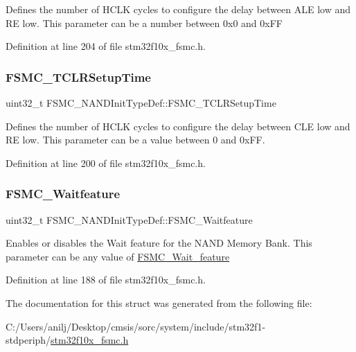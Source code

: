 Defines the number of H\+C\+LK cycles to configure the delay between A\+LE low and RE low. This parameter can be a number between 0x0 and 0x\+FF 

Definition at line 204 of file stm32f10x\+\_\+fsmc.\+h.

\mbox{\label{struct_f_s_m_c___n_a_n_d_init_type_def_a633c7be46a1d281916b9f2e34fa3d36a}} 
\subsubsection{\texorpdfstring{F\+S\+M\+C\+\_\+\+T\+C\+L\+R\+Setup\+Time}{FSMC\_TCLRSetupTime}}
{\footnotesize\ttfamily uint32\+\_\+t F\+S\+M\+C\+\_\+\+N\+A\+N\+D\+Init\+Type\+Def\+::\+F\+S\+M\+C\+\_\+\+T\+C\+L\+R\+Setup\+Time}

Defines the number of H\+C\+LK cycles to configure the delay between C\+LE low and RE low. This parameter can be a value between 0 and 0x\+FF. 

Definition at line 200 of file stm32f10x\+\_\+fsmc.\+h.

\mbox{\label{struct_f_s_m_c___n_a_n_d_init_type_def_ab350e15014c4a9f4b2c2f2848f11eeca}} 
\subsubsection{\texorpdfstring{F\+S\+M\+C\+\_\+\+Waitfeature}{FSMC\_Waitfeature}}
{\footnotesize\ttfamily uint32\+\_\+t F\+S\+M\+C\+\_\+\+N\+A\+N\+D\+Init\+Type\+Def\+::\+F\+S\+M\+C\+\_\+\+Waitfeature}

Enables or disables the Wait feature for the N\+A\+ND Memory Bank. This parameter can be any value of \hyperlink{group___f_s_m_c___wait__feature}{F\+S\+M\+C\+\_\+\+Wait\+\_\+feature} 

Definition at line 188 of file stm32f10x\+\_\+fsmc.\+h.



The documentation for this struct was generated from the following file\+:\begin{DoxyCompactItemize}
\item 
C\+:/\+Users/anilj/\+Desktop/cmsis/sorc/system/include/stm32f1-\/stdperiph/\hyperlink{stm32f10x__fsmc_8h}{stm32f10x\+\_\+fsmc.\+h}\end{DoxyCompactItemize}
